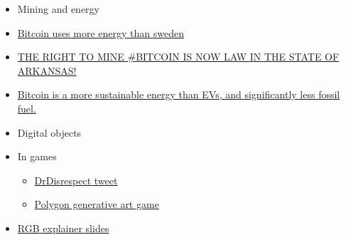 \begin{itemize}
\begin{itemize}
{    critical white house report}
  \item
    \href{https://www.nobsbitcoin.com/fedimint-hackathon-winners-announced/}{Fedimint
    Hackathon Winners Announced: 2.58 BTC in Prizes: "The quality of the
    modules that were submitted was truly impressive, with projects from
    federated storage to community finance tools that really highlighted
    the potential impact of Fedimint as a platform that could solve
    real-world problems."}
  \item
    https://geometry.xyz/notebook/A-light-introduction-to-ZeroSync
  \item
    \href{https://www.technologyreview.com/2022/04/06/1048981/worldcoin-cryptocurrency-biometrics-web3/}{Deception,
    exploited workers, and cash handouts: How Worldcoin recruited its
    first half a million test users: The startup promises a
    fairly-distributed, cryptocurrency-based universal basic income. So
    far all it\textquotesingle s done is build a biometric database from
    the bodies of the poor.}
  \item
    \href{https://github.com/ngutech21/cashu-rs}{Cashu rust
    implementation}
  \item
    \href{https://zerosync.org/}{Zerosync bitcoin rollup proofs}
  \end{itemize}
\item
  Mining and energy
\item
  \href{https://www.reddit.com/r/CryptoCurrency/comments/12xu714/bitcoin_has_just_surpassed_sweden_for_overall/}{Bitcoin
  uses more energy than sweden}
\item
  \href{https://twitter.com/satoshiactfund/status/1648445448833875969}{THE
  \textquotesingle RIGHT TO MINE\textquotesingle{} \#BITCOIN  IS NOW
  LAW IN THE STATE OF ARKANSAS!}
\item
  \href{https://www.linkedin.com/posts/danielsbatten_like-evs-bitcoin-is-a-fully-electrified-activity-7049321186605858816-t4MB?utm_source=share\&utm_medium=member_android}{Bitcoin
  is a more sustainable energy than EVs, and significantly less fossil
  fuel.}
\item
  Digital objects
\item
  In games

  \begin{itemize}
   
  \item
    \href{https://twitter.com/DrDisrespect/status/1632430208379928576}{DrDisrespect
    tweet}
  \item
    \href{https://github.com/beamable/genamon-polygon/}{Polygon
    generative art game}
  \end{itemize}
\item
  \href{https://docsend.com/view/he8x9erkjmphphvn}{RGB explainer slides}


\end{itemize}
